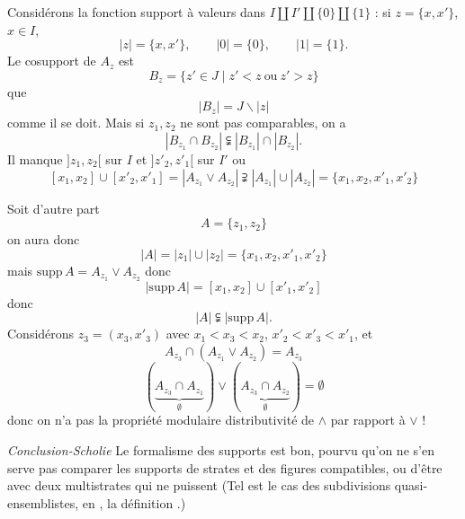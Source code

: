 \documentclass[11pt,a4paper]{article}
\begin{document}
Considérons la fonction support  \struck{\ill{}} à valeurs dans $I \amalg I' \amalg \lbrace 0 \rbrace \amalg \lbrace 1 \rbrace$ : si $z = \lbrace x, x' \rbrace$, $x \in I$,
\[
  |z| = \lbrace x, x' \rbrace , \qquad |0| = \lbrace 0 \rbrace , \qquad |1| = \lbrace 1 \rbrace .
\]
Le cosupport de $A_z$ est
\[
  B_z = \lbrace z' \in J \mid z' < z \ \text{ou}\ z' > z \rbrace
\]
\struck{\ill{}}  que
\[
  |B_z| = J \smallsetminus |z|
\]
comme il se doit.
Mais si $z_1, z_2$ ne sont pas comparables, on a
\[
  |B_{z_1} \cap B_{z_2}| \subsetneqq |B_{z_1}| \cap |B_{z_2}| .
\]
Il manque $]z_1, z_2[$ sur $I$ et $]z'_2, z'_1[$ sur $I'$ ou 
\[
  [x_1, x_2] \cup [x'_2, x'_1] = |A_{z_1} \vee A_{z_2}| \supsetneqq |A_{z_1}| \cup |A_{z_2}| = \lbrace x_1, x_2, x'_1, x'_2 \rbrace
\]

Soit d'autre part
\[
  A = \lbrace z_1, z_2 \rbrace
\]
on aura donc
\[
  |A| = |z_1| \cup |z_2| = \lbrace x_1, x_2, x'_1, x'_2 \rbrace
\]
mais $\mathrm{supp}\, A = A_{z_1} \vee A_{z_2}$ donc
\[
  |\mathrm{supp}\, A| = [x_1, x_2] \cup [x'_1, x'_2]
\]
 donc
\[
  |A| \subsetneqq |\mathrm{supp}\, A| .
\]
Considérons $z_3 = (x_3, x'_3)$ avec $x_1 < x_3 < x_2$, $x'_2 < x'_3 < x'_1$, et
\[
  A_{z_3} \cap (A_{z_1} \vee A_{z_2}) = A_{z_3}
\]
\[
  (\underbrace{A_{z_3} \cap A_{z_1}}_{\emptyset}) \vee (\underbrace{A_{z_3} \cap A_{z_2}}_{\emptyset}) = \emptyset
\]
donc on n'a pas la propriété modulaire \ill{} distributivité de $\wedge$ par rapport à $\vee$ !

\emph{Conclusion-Scholie} Le formalisme des supports est bon, pourvu qu'on \struck{\ill{} \ill{}} ne s'en serve pas \ill{} comparer les supports de strates et des figures \ill{} compatibles, ou \struck{\ill{} \ill{}}  \ill{} d'être avec deux multistrates qui ne puissent \ill{} (Tel est le cas \ill{} \ill{} des \ill{} subdivisions \ill{} quasi-ensemblistes, en \ill{} \ill{} \ill{} \ill{}, la définition  \ill{} \ill{}.)
\end{document}
